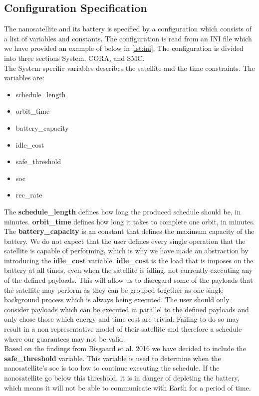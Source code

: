 \subsection{Configuration Specification} \label{subsec:init}
The nanosatellite and its battery is specified by a configuration which consists of a list of variables and constants. The configuration is read from an INI file which we have provided an example of below in \cref{lst:ini}.
The configuration is divided into three sections System, CORA, and SMC.\\
The System specific variables describes the satellite and the time constraints.
The variables are:
\begin{itemize}
	\item schedule\_length
	\item orbit\_time
	\item battery\_capacity
	\item idle\_cost
	\item safe\_threshold
	\item soc
	\item rec\_rate
\end{itemize}
The \textbf{schedule\_length} defines how long the produced schedule should be, in minutes. 
\textbf{orbit\_time} defines how long it takes to complete one orbit, in minutes. 
The \textbf{battery\_capacity} is an constant that defines the maximum capacity of the battery. We do not expect that the user defines every single operation that the satellite is capable of performing, which is why we have made an abstraction by introducing the \textbf{idle\_cost} variable. 
\textbf{idle\_cost} is the load that is imposes on the battery at all times, even when the satellite is idling, not currently executing any of the defined payloads.
This will allow us to disregard some of the payloads that the satellite may perform as they can be grouped together as one single background process which is always being executed.
The user should only consider payloads which can be executed in parallel to the defined payloads and only chose those which energy and time cost are trivial.
Failing to do so may result in a non representative model of their satellite and therefore a schedule where our guarantees may not be valid.\\
Based on the findings from Bisgaard et al. 2016\cite{gomx3} we have decided to include the \textbf{safe\_threshold} variable.
This variable is used to determine when the nanosatellite's \gls{soc} is too low to continue executing the schedule.
If the nanosatellite go below this threshold, it is in danger of depleting the battery, which means it will not be able to communicate with Earth for a period of time.
